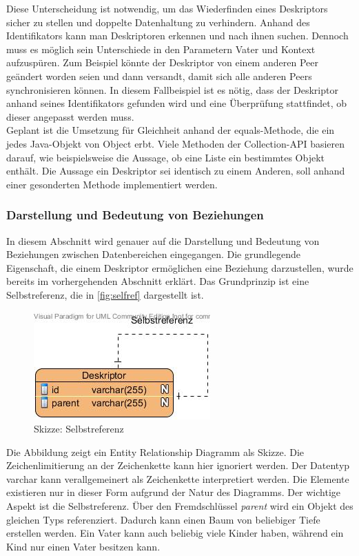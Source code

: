 \documentclass[a4paper]{article}
\begin{document}
	Diese Unterscheidung ist notwendig, um das Wiederfinden eines Deskriptors
	sicher zu stellen und doppelte Datenhaltung zu verhindern.
	Anhand des Identifikators kann man Deskriptoren erkennen und nach ihnen suchen. 
	Dennoch muss es möglich sein Unterschiede in den Parametern 
	Vater und Kontext aufzuspüren. Zum Beispiel könnte
	der Deskriptor von einem anderen Peer geändert worden seien und dann
	versandt, damit sich alle anderen Peers synchronisieren können. In diesem
	Fallbeispiel ist es nötig, dass der Deskriptor anhand seines Identifikators
	gefunden wird und eine Überprüfung stattfindet, ob dieser angepasst werden
	muss. \\
	
	Geplant ist die Umsetzung für Gleichheit anhand der equals-Methode, die ein
	jedes Java-Objekt von Object erbt. Viele Methoden der Collection-API basieren
	darauf, wie beispielsweise die Aussage, ob eine Liste ein bestimmtes Objekt
	enthält. Die Aussage ein Deskriptor sei identisch zu einem Anderen, soll anhand
	einer gesonderten Methode implementiert werden.
	
	\subsubsection{Darstellung und Bedeutung von Beziehungen}
	
	In diesem Abschnitt wird genauer auf die Darstellung und Bedeutung von 
	Beziehungen zwischen Datenbereichen eingegangen. Die grundlegende
	Eigenschaft, die einem Deskriptor ermöglichen eine Beziehung darzustellen,
	wurde bereits im vorhergehenden Abschnitt erklärt. Das Grundprinzip ist eine
	Selbstreferenz, die in \autoref{fig:selfref} dargestellt ist.
	
	\begin{figure}[H] 
		\centerline{
			\includegraphics[scale=1]{../Bilder/selfref.jpg}
		}
		\caption{Skizze: Selbstreferenz}
		\label{fig:selfref}
	\end{figure}
	
	Die Abbildung zeigt ein Entity Relationship Diagramm als Skizze. Die 
	Zeichenlimitierung an der Zeichenkette kann hier ignoriert werden. Der Datentyp 	
	varchar kann verallgemeinert als Zeichenkette interpretiert werden. Die
	Elemente existieren nur in dieser Form aufgrund der Natur des Diagramms.
	Der wichtige Aspekt ist die Selbstreferenz. Über den Fremdschlüssel
	\emph{parent} wird ein Objekt des gleichen Typs referenziert. Dadurch kann
	einen Baum von beliebiger Tiefe erstellen werden. Ein Vater kann 
	auch beliebig viele Kinder haben, während ein Kind nur einen Vater besitzen
	kann. \\
	
\end{document}
